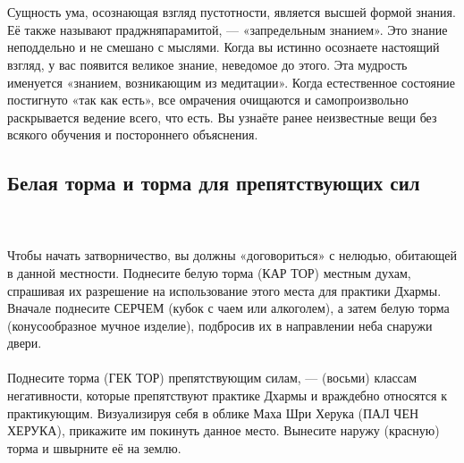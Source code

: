 \\ \\ Сущность ума, осознающая взгляд пустотности, является высшей формой знания. Её также называют праджняпарамитой, — «запредельным знанием». Это знание неподдельно и не смешано с мыслями. Когда вы истинно осознаете настоящий взгляд, у вас появится великое знание, неведомое до этого. Эта мудрость именуется «знанием, возникающим из медитации». Когда естественное состояние постигнуто «так как есть», все омрачения очищаются и самопроизвольно раскрывается ведение всего, что есть. Вы узнаёте ранее неизвестные вещи без всякого обучения и постороннего объяснения.
\subsection{Белая торма и торма для препятствующих сил}
\\ \\ Чтобы начать затворничество, вы должны «договориться» с нелюдью, обитающей в данной местности. Поднесите белую торма (КАР ТОР) местным духам, спрашивая их разрешение на использование этого места для практики Дхармы. Вначале поднесите СЕРЧЕМ (кубок с чаем или алкоголем), а затем белую торма (конусообразное мучное изделие), подбросив их в направлении неба снаружи двери.
\\ \\ Поднесите торма (ГЕК ТОР) препятствующим силам, — (восьми) классам негативности, которые препятствуют практике Дхармы и враждебно относятся к практикующим. Визуализируя себя в облике Маха Шри Херука (ПАЛ ЧЕН ХЕРУКА), прикажите им покинуть данное место. Вынесите наружу (красную) торма и швырните её на землю.
